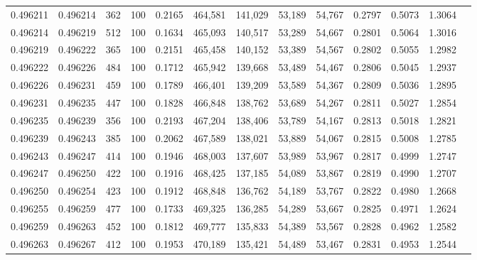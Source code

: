 \begin{tabular}{rrrrrrrrrrrrr}
0.496211 & 0.496214 &   362 & 100 &                                     0.2165 & 464,581 & 141,029 &  53,189 &  54,767 & 0.2797 & 0.5073 & 1.3064 \\
0.496214 & 0.496219 &   512 & 100 &                                     0.1634 & 465,093 & 140,517 &  53,289 &  54,667 & 0.2801 & 0.5064 & 1.3016 \\
0.496219 & 0.496222 &   365 & 100 &                                     0.2151 & 465,458 & 140,152 &  53,389 &  54,567 & 0.2802 & 0.5055 & 1.2982 \\
0.496222 & 0.496226 &   484 & 100 &                                     0.1712 & 465,942 & 139,668 &  53,489 &  54,467 & 0.2806 & 0.5045 & 1.2937 \\
0.496226 & 0.496231 &   459 & 100 &                                     0.1789 & 466,401 & 139,209 &  53,589 &  54,367 & 0.2809 & 0.5036 & 1.2895 \\
0.496231 & 0.496235 &   447 & 100 &                                     0.1828 & 466,848 & 138,762 &  53,689 &  54,267 & 0.2811 & 0.5027 & 1.2854 \\
0.496235 & 0.496239 &   356 & 100 &                                     0.2193 & 467,204 & 138,406 &  53,789 &  54,167 & 0.2813 & 0.5018 & 1.2821 \\
0.496239 & 0.496243 &   385 & 100 &                                     0.2062 & 467,589 & 138,021 &  53,889 &  54,067 & 0.2815 & 0.5008 & 1.2785 \\
0.496243 & 0.496247 &   414 & 100 &                                     0.1946 & 468,003 & 137,607 &  53,989 &  53,967 & 0.2817 & 0.4999 & 1.2747 \\
0.496247 & 0.496250 &   422 & 100 &                                     0.1916 & 468,425 & 137,185 &  54,089 &  53,867 & 0.2819 & 0.4990 & 1.2707 \\
0.496250 & 0.496254 &   423 & 100 &                                     0.1912 & 468,848 & 136,762 &  54,189 &  53,767 & 0.2822 & 0.4980 & 1.2668 \\
0.496255 & 0.496259 &   477 & 100 &                                     0.1733 & 469,325 & 136,285 &  54,289 &  53,667 & 0.2825 & 0.4971 & 1.2624 \\
0.496259 & 0.496263 &   452 & 100 &                                     0.1812 & 469,777 & 135,833 &  54,389 &  53,567 & 0.2828 & 0.4962 & 1.2582 \\
0.496263 & 0.496267 &   412 & 100 &                                     0.1953 & 470,189 & 135,421 &  54,489 &  53,467 & 0.2831 & 0.4953 & 1.2544 \\

\end{tabular}
